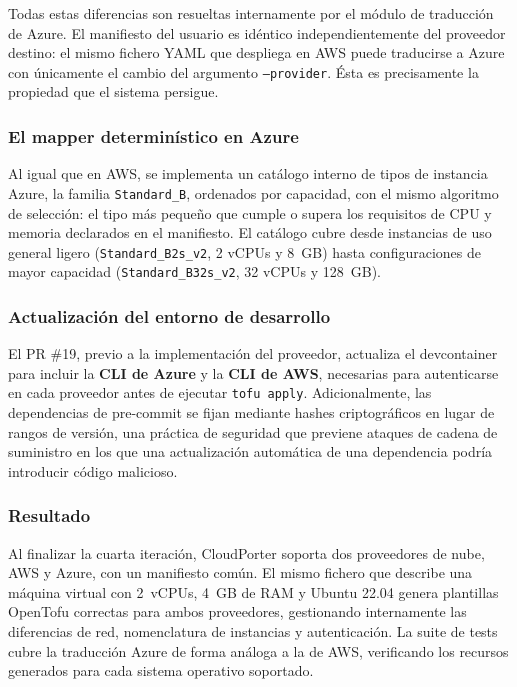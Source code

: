 Todas estas diferencias son resueltas internamente por el módulo de traducción de Azure.
El manifiesto del usuario es idéntico independientemente del proveedor destino: el mismo
fichero YAML que despliega en AWS puede traducirse a Azure con únicamente el cambio del
argumento \texttt{--provider}. Ésta es precisamente la propiedad que el sistema persigue.

\subsubsection{El mapper determinístico en Azure}

Al igual que en AWS, se implementa un catálogo interno de tipos de instancia Azure, la
familia \texttt{Standard\_B}, ordenados por capacidad, con el mismo algoritmo de selección:
el tipo más pequeño que cumple o supera los requisitos de CPU y memoria declarados en el
manifiesto. El catálogo cubre desde instancias de uso general ligero (\texttt{Standard\_B2s\_v2},
2 vCPUs y 8~GB) hasta configuraciones de mayor capacidad (\texttt{Standard\_B32s\_v2},
32 vCPUs y 128~GB).

\subsubsection{Actualización del entorno de desarrollo}

El PR \#19, previo a la implementación del proveedor, actualiza el devcontainer para incluir
la \textbf{CLI de Azure} y la \textbf{CLI de AWS}, necesarias para autenticarse en cada
proveedor antes de ejecutar \texttt{tofu apply}. Adicionalmente, las dependencias de
pre-commit se fijan mediante hashes criptográficos en lugar de rangos de versión, una práctica
de seguridad que previene ataques de cadena de suministro en los que una actualización
automática de una dependencia podría introducir código malicioso.

\subsubsection{Resultado}

Al finalizar la cuarta iteración, CloudPorter soporta dos proveedores de nube, AWS y
Azure, con un manifiesto común. El mismo fichero que describe una máquina virtual con
2~vCPUs, 4~GB de RAM y Ubuntu 22.04 genera plantillas OpenTofu correctas para ambos
proveedores, gestionando internamente las diferencias de red, nomenclatura de instancias
y autenticación. La suite de tests cubre la traducción Azure de forma análoga a la de AWS,
verificando los recursos generados para cada sistema operativo soportado.

